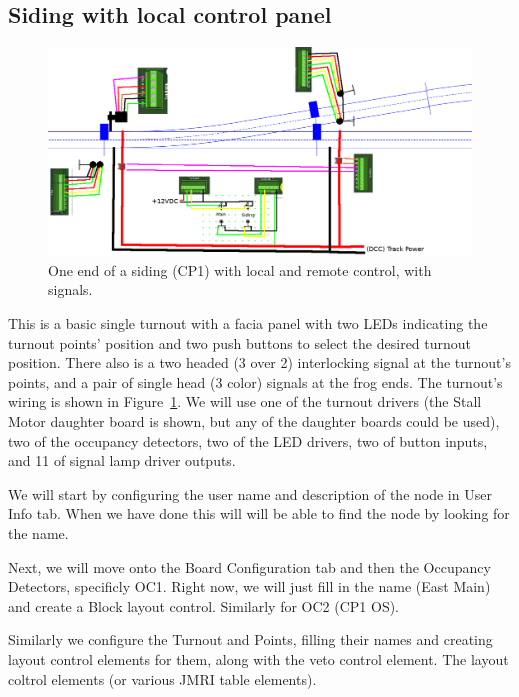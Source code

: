 \documentclass[12pt,twoside]{article}
\begin{document}
\subsection{Siding with local control panel}
\label{sect-appl:siding}
\begin{figure}[hbpt]\begin{centering}%
\includegraphics[width=5in]{ExampleSidingCP1-Wiring.png}
\caption{One end of a siding (CP1) with local and remote control, with 
signals.}
\label{fig:ExampleSidingCP1-Wiring}
\end{centering}\end{figure}

This is a basic single turnout with a facia panel with two LEDs indicating the
turnout points' position and two push buttons to select the desired turnout
position. There also is a two headed (3 over 2) interlocking signal at the
turnout's points, and a pair of single head (3 color) signals at the frog
ends. The turnout's wiring is shown in 
Figure~\ref{fig:ExampleSidingCP1-Wiring}. We will use one of the turnout 
drivers (the Stall Motor daughter board is shown, but any of the daughter 
boards could be used), two of the occupancy detectors, two of the LED drivers, 
two of button inputs, and 11 of signal lamp driver outputs.

We will start by configuring the user name and description of the node in User 
Info tab.  When we have done this will will be able to find the node by 
looking for the name.  

Next, we will move onto the Board Configuration tab and then the Occupancy
Detectors, specificly OC1. Right now, we will just fill in the name (East
Main) and create a Block layout control. Similarly for OC2 (CP1 OS).

Similarly we configure the Turnout and Points, filling their names and
creating layout control elements for them, along with the veto control
element. The layout coltrol elements (or various JMRI table elements). 
\end{document}
